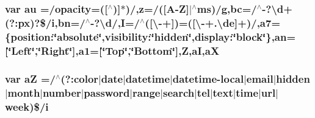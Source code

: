 \subsubsection[{au}]{\setlength{\rightskip}{0pt plus 5cm}var au =/opacity=([$^\wedge$)]$\ast$)/,z=/([A-\/{\bf Z}]$\vert$$^\wedge$ms)/g,bc=/$^\wedge$-\/?\textbackslash{}d+(?\-:px)?\$/i,bn=/$^\wedge$-\/?\textbackslash{}d/,I=/$^\wedge$([\textbackslash{}-\/+])=([\textbackslash{}-\/+.\textbackslash{}de]+)/,a7=\{position\-:\char`\"{}absolute\char`\"{},visibility\-:\char`\"{}hidden\char`\"{},display\-:\char`\"{}block\char`\"{}\},an=[\char`\"{}Left\char`\"{},\char`\"{}Right\char`\"{}],a1=[\char`\"{}Top\char`\"{},\char`\"{}Bottom\char`\"{}],Z,a\-I,a\-X}\label{html_2jquery_8js_a4fd8ddfab07c8d7c7cae0ab0e052cad3}
\subsubsection[{a\-Z}]{\setlength{\rightskip}{0pt plus 5cm}var a\-Z =/$^\wedge$(?\-:color$\vert$date$\vert$datetime$\vert$datetime-\/local$\vert$email$\vert$hidden$\vert$month$\vert$number$\vert$password$\vert$range$\vert$search$\vert$tel$\vert$text$\vert$time$\vert$url$\vert$week)\$/i}\label{html_2jquery_8js_ac87125cdee1a5e57da4ef619af49bc7d}
